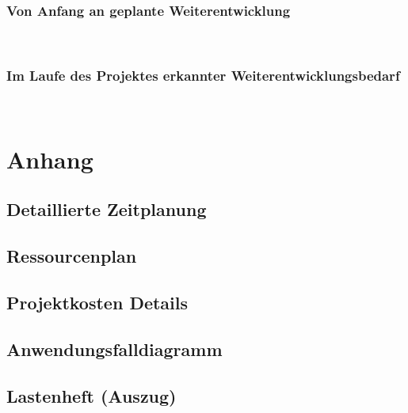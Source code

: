 \documentclass[11pt,toc=sectionentrywithoutdots, headheight=44pt, headings=optiontoheadandtoc, hyperfootnotes=false]{scrartcl}
\begin{document}
\subsubsection{Von Anfang an geplante Weiterentwicklung}
\blindtext\

\subsubsection{Im Laufe des Projektes erkannter Weiterentwicklungsbedarf}
\blindtext\


\newpage
\setcounter{secnumdepth}{0}

\printbibliography



\label{myLastPage}

\newpage


\setcounter{page}{1}
\setcounter{secnumdepth}{2}
\setcounter{section}{1}
\renewcommand{\thesection}{A}


\ofoot{\thepage}




\section{Anhang}
\subsection{Detaillierte Zeitplanung}
\blindtext

\subsection{Ressourcenplan}
\blindtext\blindtext

\subsection{Projektkosten Details}
\blindtext\blindtext

\subsection{Anwendungsfalldiagramm}
\blindtext\blindtext

\subsection{Lastenheft (Auszug)}
\blindtext\blindtext
\end{document}
